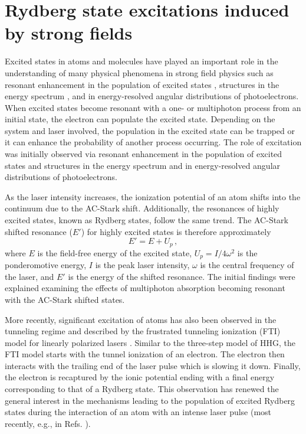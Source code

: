 \section{Rydberg state excitations induced by strong fields} %
\label{sec:rydberg_state_excitations_induce_by_strong_fields}
Excited states in atoms and molecules have played an important role in the understanding of many physical phenomena in strong field physics such as  resonant enhancement in the population of excited states \cite{deboer1992,jones1992}, structures in the energy spectrum \cite{freeman1987,perry1989,agostini1989}, and in energy-resolved angular distributions \cite{rottke1994} of photoelectrons. When excited states become resonant with a one- or multiphoton process from an initial state, the electron can populate the excited state. Depending on the system and laser involved, the population in the excited state can be trapped or it can enhance the probability of another process occurring. The role of excitation was initially observed via resonant enhancement in the population of excited states \cite{deboer1992,jones1992} and structures in the energy spectrum \cite{freeman1987,perry1989,agostini1989} and in energy-resolved angular distributions \cite{rottke1994} of photoelectrons. 

As the laser intensity increases, the ionization potential of an atom shifts into the continuum due to the AC-Stark shift. Additionally, the resonances of highly excited states, known as Rydberg states, follow the same trend. The AC-Stark shifted resonance ($E'$) for highly excited states is therefore approximately 
\begin{equation}
    E' = E + U_p\, ,
\end{equation}
where $E$ is the field-free energy of the excited state, $U_p = I/4\omega^2$ is the ponderomotive energy, $I$ is the peak laser intensity, $\omega$ is the central frequency of the laser, and $E'$ is the energy of the shifted resonance. The initial findings were explained examining the effects of multiphoton absorption becoming resonant with the AC-Stark shifted states.

More recently, significant excitation of atoms has also been observed in the tunneling regime and described by the frustrated tunneling ionization (FTI) model for linearly polarized lasers \cite{nubbemeyer2008}. Similar to the three-step model of HHG, the FTI model starts with the tunnel ionization of an electron. The electron then interacts with the trailing end of the laser pulse which is slowing it down. Finally, the electron is recaptured by the ionic potential ending with a final energy corresponding to that of a Rydberg state. This observation has renewed the general interest in the mechanisms leading to the population of excited Rydberg states during the interaction of an atom with an intense laser pulse (most recently, e.g., in Refs. \cite{chini2014,li2014,li2014b,zimmermann2015,shao2015,camp2015,li2015,fechner2015,bredtmann2016,fushitani2016,lv2016,serebryannikov2016,hart2016,li2016,xiong2016,beaulieu2016,larimian2016,zimmermann2017,bengtsson2017,gao2017,ivanov2017,ilchen2017,mancuso2017,xiong2017,piraux2017}).

